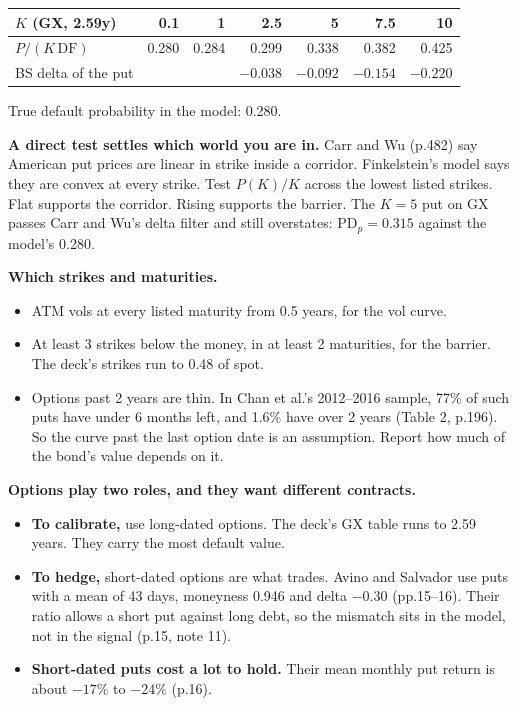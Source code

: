 \documentclass[10pt,a4paper]{article}
\newcommand{\DF}{\mathrm{DF}}
\begin{document}
\begin{center}
\footnotesize
\begin{tabular}{@{}lrrrrrr@{}}
\toprule
$K$ (GX, 2.59y) & 0.1 & 1 & 2.5 & 5 & 7.5 & 10\\
\midrule
$P/(K\,\DF)$ & 0.280 & 0.284 & 0.299 & 0.338 & 0.382 & 0.425\\
BS delta of the put & & & $-0.038$ & $-0.092$ & $-0.154$ & $-0.220$\\
\bottomrule
\end{tabular}

\smallskip
True default probability in the model: 0.280.
\end{center}

\textbf{A direct test settles which world you are in.} Carr and Wu (p.482) say American put prices are linear in strike inside a corridor. Finkelstein's model says they are convex at every strike. Test $P(K)/K$ across the lowest listed strikes. Flat supports the corridor. Rising supports the barrier. The $K=5$ put on GX passes Carr and Wu's delta filter and still overstates: $\mathrm{PD}_p=0.315$ against the model's 0.280.

\textbf{Which strikes and maturities.}
\begin{itemize}[nosep]
\item ATM vols at every listed maturity from 0.5 years, for the vol curve.
\item At least 3 strikes below the money, in at least 2 maturities, for the barrier. The deck's strikes run to 0.48 of spot.
\item Options past 2 years are thin. In Chan et al.'s 2012--2016 sample, 77\% of such puts have under 6 months left, and 1.6\% have over 2 years (Table 2, p.196). So the curve past the last option date is an assumption. Report how much of the bond's value depends on it.
\end{itemize}

\textbf{Options play two roles, and they want different contracts.}
\begin{itemize}[nosep]
\item \textbf{To calibrate,} use long-dated options. The deck's GX table runs to 2.59 years. They carry the most default value.
\item \textbf{To hedge,} short-dated options are what trades. Avino and Salvador use puts with a mean of 43 days, moneyness 0.946 and delta $-0.30$ (pp.15--16). Their ratio allows a short put against long debt, so the mismatch sits in the model, not in the signal (p.15, note 11).
\item \textbf{Short-dated puts cost a lot to hold.} Their mean monthly put return is about $-17\%$ to $-24\%$ (p.16).
\end{itemize}
\end{document}
